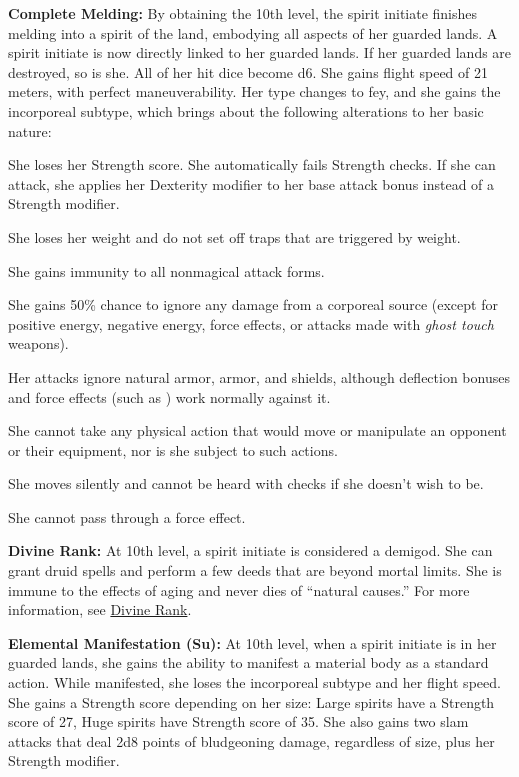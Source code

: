 {\textbf{Complete Melding:} By obtaining the 10th level, the spirit initiate finishes melding into a spirit of the land, embodying all aspects of her guarded lands. A spirit initiate is now directly linked to her guarded lands. If her guarded lands are destroyed, so is she. All of her hit dice become d6. She gains flight speed of 21 meters, with perfect maneuverability. Her type changes to fey, and she gains the incorporeal subtype, which brings about the following alterations to her basic nature:
\begin{itemize*}
\item She loses her Strength score. She automatically fails Strength checks. If she can attack, she applies her Dexterity modifier to her base attack bonus instead of a Strength modifier.
\item She loses her weight and do not set off traps that are triggered by weight.
\item She gains immunity to all nonmagical attack forms.
\item She gains 50\% chance to ignore any damage from a corporeal source (except for positive energy, negative energy, force effects, or attacks made with \emph{ghost touch} weapons).
\item Her attacks ignore natural armor, armor, and shields, although deflection bonuses and force effects (such as ) work normally against it.
\item She cannot take any physical action that would move or manipulate an opponent or their equipment, nor is she subject to such actions.
\item She moves silently and cannot be heard with  checks if she doesn't wish to be.
\item She cannot pass through a force effect.
\end{itemize*}

\textbf{Divine Rank:} At 10th level, a spirit initiate is considered a demigod. She can grant druid spells and perform a few deeds that are beyond mortal limits. She is immune to the effects of aging and never dies of ``natural causes.'' For more information, see \hyperref[Divine Rank]{Divine Rank}.
}

\textbf{Elemental Manifestation (Su):} At 10th level, when a spirit initiate is in her guarded lands, she gains the ability to manifest a material body as a standard action. While manifested, she loses the incorporeal subtype and her flight speed. She gains a Strength score depending on her size: Large spirits have a Strength score of 27, Huge spirits have Strength score of 35. She also gains two slam attacks that deal 2d8 points of bludgeoning damage, regardless of size, plus her Strength modifier.


